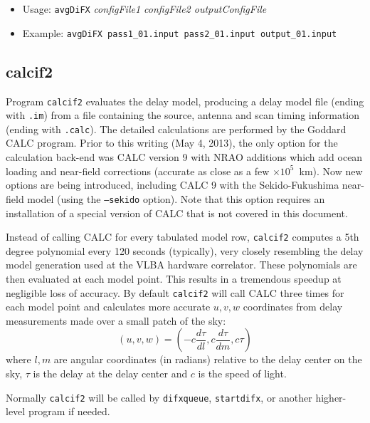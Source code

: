 \begin{itemize}
\item[] Usage: {\tt avgDiFX} {\em configFile1 configFile2 outputConfigFile}
\item[] Example: {\tt avgDiFX pass1\_01.input pass2\_01.input output\_01.input} 
\end{itemize}




\subsection{calcif2} \label{sec:calcif2}

Program {\tt calcif2} evaluates the delay model, producing a delay model file (ending with {\tt .im}) from a file containing the source, antenna and scan timing information (ending with {\tt .calc}).
The detailed calculations are performed by the Goddard CALC program.
Prior to this writing (May 4, 2013), the only option for the calculation back-end was CALC version 9 with NRAO additions which add ocean loading and near-field corrections (accurate as close as a few $\times 10^5$~km). 
Now new options are being introduced, including CALC 9 with the Sekido-Fukushima near-field model (using the {\tt --sekido} option).
Note that this option requires an installation of a special version of CALC that is not covered in this document.

Instead of calling CALC for every tabulated model row, {\tt calcif2} computes a 5th degree polynomial every 120 seconds (typically),
very closely resembling the delay model generation used at the VLBA hardware correlator.
These polynomials are then evaluated at each model point.
This results in a tremendous speedup at negligible loss of accuracy.
By default {\tt calcif2} will call CALC three times for each model point and calculates more accurate $u, v, w$ coordinates from delay measurements made over a small patch of the sky:
\begin{equation}
(u, v, w) = \left(-c \frac{d \tau}{d l}, c \frac{d \tau}{d m}, c \tau \right)
\end{equation}
where $l, m$ are angular coordinates (in radians) relative to the delay center on the sky, $\tau$ is the delay at the delay center and $c$ is the speed of light.

Normally {\tt calcif2} will be called by {\tt difxqueue}, {\tt startdifx}, or another higher-level program if needed.

